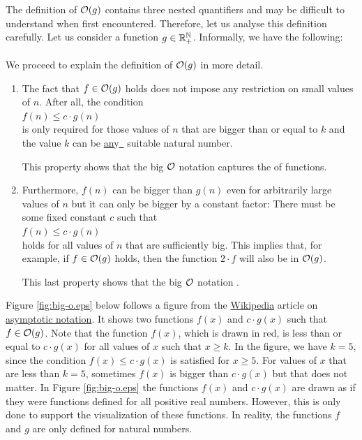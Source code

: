 The definition of $\mathcal{O}(g)$ contains three nested quantifiers and may be difficult to understand
when first encountered.  Therefore, let us analyse this definition carefully.  Let us consider a
function $g \in {\mathbb R}_+^{\mathbb N}$.  Informally, we have the following:
\\[0.2cm]
\hspace*{1.3cm}
\colorbox{red}{}
\\[0.2cm]
We proceed to explain the definition of $\mathcal{O}(g)$ in more detail.
\begin{enumerate}
\item The fact that $f \in \mathcal{O}(g)$ holds does not impose any restriction on small values of $n$.
      After all, the condition
      \\[0.2cm]
      \hspace*{1.3cm}
      $f(n) \leq c \cdot g(n)$
      \\[0.2cm]
      is only required for those values of $n$ that are bigger than or equal to $k$ and the value
      $k$ can be \underline{an}y\hspace*{-0.1cm}\underline{\ } suitable natural number.

      This property shows that the big $\mathcal{O}$ notation captures the  of functions.
\item Furthermore, $f(n)$ can be bigger than $g(n)$ even for arbitrarily large values of $n$
      but it can only be bigger by a constant factor:  There must be some fixed constant $c$
      such that 
      \\[0.2cm]
      \hspace*{1.3cm}
      $f(n) \leq c \cdot g(n)$
      \\[0.2cm]
      holds for all values of $n$ that are sufficiently big.  This implies that, for example, if $f \in \mathcal{O}(g)$
      holds, then the function $2 \cdot f$ will also be in $\mathcal{O}(g)$.

      This last property shows that the big $\mathcal{O}$ notation .
\end{enumerate}
Figure \ref{fig:big-o.eps} below follows a figure from the \href{http://www.wikipedia.org}{Wikipedia} article on
\href{http://en.wikipedia.org/wiki/Asymptotic_notation}{asymptotic notation}.  It shows two functions
$f(x)$ and $c \cdot g(x)$ such that $f \in \mathcal{O}(g)$.  Note that the function $f(x)$, which is drawn
in red, is less than or equal to $c \cdot g(x)$ for all values of $x$ such that $x \geq k$.  In the
figure, we have $k=5$, since the condition $f(x) \leq c \cdot g(x)$ is satisfied for $x \geq 5$. For
values of $x$ that are less than $k = 5$, sometimes $f(x)$ is bigger than $c \cdot g(x)$ but that does
not matter.  In Figure \ref{fig:big-o.eps} the functions $f(x)$ and $c \cdot g(x)$ are drawn as if they were
functions defined for all positive real numbers.  However, this is only done to support the
visualization of these functions.  In reality, the functions $f$ and $g$ are only defined for
natural numbers.


